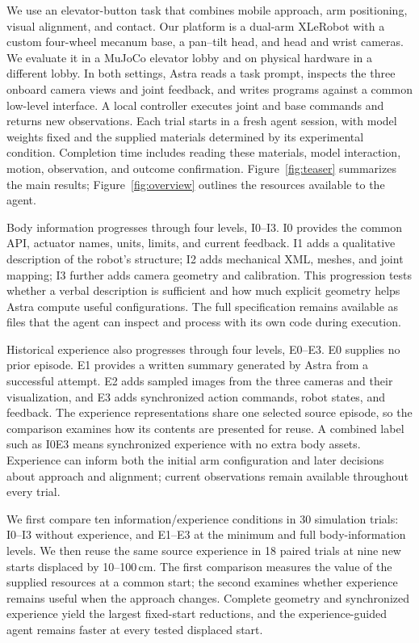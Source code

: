 \documentclass[11pt]{article}
\begin{document}
We use an elevator-button task that combines mobile approach, arm positioning, visual alignment, and contact. Our platform is a dual-arm XLeRobot with a custom four-wheel mecanum base, a pan--tilt head, and head and wrist cameras. We evaluate it in a MuJoCo elevator lobby and on physical hardware in a different lobby. In both settings, Astra reads a task prompt, inspects the three onboard camera views and joint feedback, and writes programs against a common low-level interface. A local controller executes joint and base commands and returns new observations. Each trial starts in a fresh agent session, with model weights fixed and the supplied materials determined by its experimental condition. Completion time includes reading these materials, model interaction, motion, observation, and outcome confirmation. Figure~\ref{fig:teaser} summarizes the main results; Figure~\ref{fig:overview} outlines the resources available to the agent.

Body information progresses through four levels, I0--I3. I0 provides the common API, actuator names, units, limits, and current feedback. I1 adds a qualitative description of the robot's structure; I2 adds mechanical XML, meshes, and joint mapping; I3 further adds camera geometry and calibration. This progression tests whether a verbal description is sufficient and how much explicit geometry helps Astra compute useful configurations. The full specification remains available as files that the agent can inspect and process with its own code during execution.

Historical experience also progresses through four levels, E0--E3. E0 supplies no prior episode. E1 provides a written summary generated by Astra from a successful attempt. E2 adds sampled images from the three cameras and their visualization, and E3 adds synchronized action commands, robot states, and feedback. The experience representations share one selected source episode, so the comparison examines how its contents are presented for reuse. A combined label such as I0E3 means synchronized experience with no extra body assets. Experience can inform both the initial arm configuration and later decisions about approach and alignment; current observations remain available throughout every trial.

We first compare ten information/experience conditions in 30 simulation trials: I0--I3 without experience, and E1--E3 at the minimum and full body-information levels. We then reuse the same source experience in 18 paired trials at nine new starts displaced by 10--100\,cm. The first comparison measures the value of the supplied resources at a common start; the second examines whether experience remains useful when the approach changes. Complete geometry and synchronized experience yield the largest fixed-start reductions, and the experience-guided agent remains faster at every tested displaced start.
\end{document}
